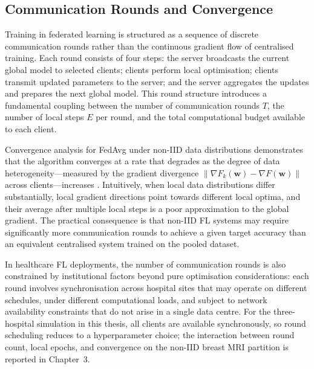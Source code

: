 \subsection{Communication Rounds and Convergence}
\label{sec:comm-rounds}

Training in federated learning is structured as a sequence of discrete
communication rounds rather than the continuous gradient flow of centralised
training.
Each round consists of four steps: the server broadcasts the current global
model to selected clients; clients perform local optimisation; clients transmit
updated parameters to the server; and the server aggregates the updates and
prepares the next global model.
This round structure introduces a fundamental coupling between the number of
communication rounds $T$, the number of local steps $E$ per round, and the
total computational budget available to each client.

Convergence analysis for FedAvg under non-IID data distributions demonstrates
that the algorithm converges at a rate that degrades as the degree of data
heterogeneity---measured by the gradient divergence
$\|\nabla F_k(\mathbf{w}) - \nabla F(\mathbf{w})\|$ across clients---increases
\cite{kairouz2021advances}.
Intuitively, when local data distributions differ substantially, local gradient
directions point towards different local optima, and their average after
multiple local steps is a poor approximation to the global gradient.
The practical consequence is that non-IID FL systems may require significantly
more communication rounds to achieve a given target accuracy than an equivalent
centralised system trained on the pooled dataset.

In healthcare FL deployments, the number of communication rounds is also
constrained by institutional factors beyond pure optimisation considerations:
each round involves synchronisation across hospital sites that may operate on
different schedules, under different computational loads, and subject to
network availability constraints that do not arise in a single data centre.
For the three-hospital simulation in this thesis, all clients are available
synchronously, so round scheduling reduces to a hyperparameter choice; the
interaction between round count, local epochs, and convergence on the non-IID
breast MRI partition is reported in Chapter~3.
